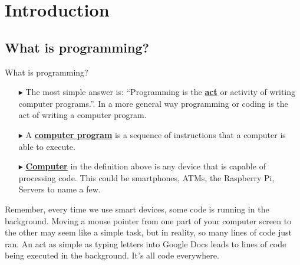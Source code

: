 \documentclass[xcolor={dvipsnames,rgb}, aspectratio=169]{beamer}
\begin{document}
\section{Introduction}
\subsection{What is programming?}
\begin{frame}{What is programming?}
\small{
\begin{itemize}
   \item[$\blacktriangleright$] The most simple answer is: ``Programming is the
      \underline{\textbf{act}} or activity of writing computer programs.''. In a
      more general way programming or coding is the act of writing a computer program.

   \item[$\blacktriangleright$] A \underline{\textbf{computer program}} is a sequence of
      instructions that a computer is able to execute.

   \item[$\blacktriangleright$] \underline{\textbf{Computer}} in the definition above is
      any device that is capable of processing code. This could be smartphones, ATMs, the
      Raspberry Pi, Servers to name a few.
\end{itemize}

Remember, every time we use smart devices, some code is running in the background.
Moving a mouse pointer from one part of your computer screen to the other may seem
like a simple task, but in reality, so many lines of code just ran. An act as simple
as typing letters into Google Docs leads to lines of code being executed in the
background. It’s all code everywhere.}
\end{frame}
\end{document}
